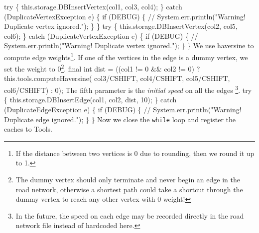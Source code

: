 try \{
  this.storage.DBInsertVertex(col1, col3, col4);
\} catch (DuplicateVertexException e) \{
  if (DEBUG) \{
    // System.err.println("Warning! Duplicate vertex ignored.");
  \}
\}
try \{
  this.storage.DBInsertVertex(col2, col5, col6);
\} catch (DuplicateVertexException e) \{
  if (DEBUG) \{
    // System.err.println("Warning! Duplicate vertex ignored.");
  \}
\}
\nwendcode{}\nwdocspar
{\small We use haversine to compute edge weights\footnote{If the distance between two
vertices is 0 due to rounding, then we round it up to 1.}.  If one of the
vertices in the edge is a dummy vertex, we set the weight to 0\footnote{The
dummy vertex should only terminate and never begin an edge in the road network,
otherwise a shortest path could take a shortcut through the dummy vertex to
reach any other vertex with 0 weight!}.}
\nwenddocs{}\plusendmoddef
final int dist = ((col1 != 0 && col2 != 0)
  ? this.tools.computeHaversine(
        col3/CSHIFT, col4/CSHIFT,
        col5/CSHIFT, col6/CSHIFT) : 0);
\nwendcode{}\nwdocspar
{\small The fifth parameter is the \textit{initial speed} on all the edges
\footnote{In the future, the speed on each edge may be recorded directly in the
road network file instead of hardcoded here.}.}
\nwenddocs{}\plusendmoddef
try \{
  this.storage.DBInsertEdge(col1, col2, dist, 10);
\} catch (DuplicateEdgeException e) \{
  if (DEBUG) \{
    // System.err.println("Warning! Duplicate edge ignored.");
  \}
\}
\nwendcode{}\nwdocspar
{\small Now we close the {\tt{}while} loop and register the caches to Tools.}
\nwenddocs{}\plusendmoddef
